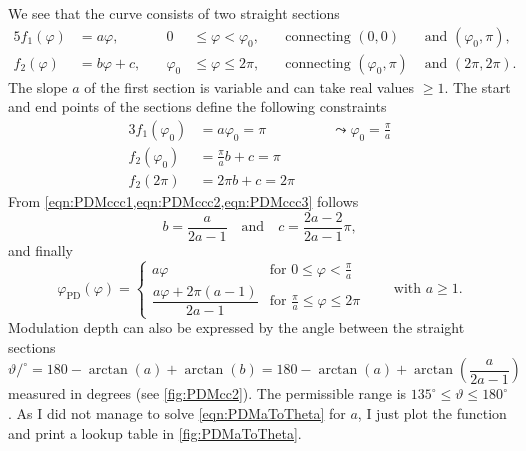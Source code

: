 \documentclass[a4paper]{article}
\begin{document}
We see that the curve consists of two straight sections
\begin{alignat}{5}
  f_1(\varphi) &= a\varphi, 
  & \quad 0&\leq\varphi <\varphi_0, 
  & \quad\text{connecting } (0,0) &\text{ and } (\varphi_0,\pi),
\\
  f_2(\varphi) &= b\varphi+c, 
  & \quad \varphi_0&\leq\varphi \leq 2\pi, 
  & \quad\text{connecting } (\varphi_0,\pi) &\text{ and } (2\pi,2\pi).
\end{alignat}
The slope $a$ of the first section is variable and can take real values $\geq
1$. The start and end points of the sections define the following constraints
\begin{alignat}{3}
  \label{eqn:PDMccc1}
  f_1(\varphi_0) &= a\varphi_0 = \pi
  && \quad\leadsto \varphi_0 = \frac{\pi}{a}
\\
  \label{eqn:PDMccc2}
  f_2(\varphi_0) &= \frac{\pi}{a}b + c = \pi
\\
  \label{eqn:PDMccc3}
  f_2(2\pi) &= 2\pi b + c = 2\pi
\end{alignat}
From \cref{eqn:PDMccc1,eqn:PDMccc2,eqn:PDMccc3} follows
\begin{equation}
  b = \frac{a}{2a-1}
  \quad\text{and}\quad
  c = \frac{2a-2}{2a-1}\pi,
\end{equation}
and finally
\begin{equation}
  \varphi_{\text{PD}}(\varphi)
  = \begin{cases}
      a\varphi
      & \text{for }0\leq\varphi < \frac{\pi}{a}
    \\[6pt]
      \dfrac{a\varphi+2\pi(a-1)}{2a-1}
      & \text{for }\frac{\pi}{a}\leq\varphi \leq 2\pi 
    \end{cases}
  \qquad\text{with }a\geq 1.
\end{equation}
Modulation depth can also be expressed by the angle between the straight
sections
\begin{equation}
  \label{eqn:PDMaToTheta}
  \vartheta/^{\circ} 
  = 180-\arctan(a)+\arctan(b)
  = 180-\arctan(a)+\arctan\!\left(\frac{a}{2a-1}\right)
\end{equation}
measured in degrees (see \cref{fig:PDMcc2}). The permissible range is
$135^\circ\leq\vartheta\leq 180^\circ$ \cite{Ger09}. As I did not manage to
solve \cref{eqn:PDMaToTheta} for $a$, I just plot the function and print a
lookup table in \cref{fig:PDMaToTheta}.
%
\end{document}
